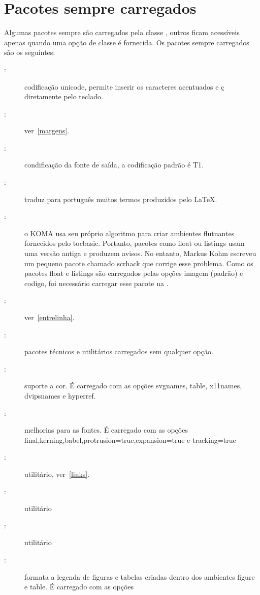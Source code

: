 \section{Pacotes sempre carregados}

Algumas pacotes sempre são carregados pela classe \estilo, outros ficam 
acessíveis apenas quando uma opção de classe é fornecida. Os pacotes 
sempre carregados são os seguintes:
\begin{description}
   \item[:] codificação unicode, permite inserir os 
   caracteres acentuados e ç diretamente pelo teclado.
   \item[:] ver~\ref{margens}.
   \item[:] condificação da fonte de saída, a codificação padrão é T1.
   \item[:] traduz para português muitos termos
        produzidos pelo \LaTeX.
   \item[:] o KOMA usa seu próprio algoritmo para criar
        ambientes flutuantes fornecidos pelo tocbasic. Portanto, pacotes
        como float ou listings usam uma versão antiga e produzem avisos.
        No entanto, Markus Kohm escreveu um pequeno pacote chamado scrhack
        que corrige esse problema. Como os pacotes float e listings são carregados
        pelas opções imagem (padrão) e codigo, foi necessário carregar esse pacote
        na \estilo.
   \item[:] ver~\ref{entrelinha}.
   \item[:] pacotes técnicos e utilitários carregados sem
   	    qualquer opção.
   \item[:] suporte a cor. É carregado com as opções
        svgnames, table, x11names, dvipsnames e hyperref.
   \item[:] melhorias para as fontes. É carregado com as opções
        final,kerning,babel,protrusion=true,expansion=true e tracking=true
   \item[:] utilitário, ver~\ref{links}.
   \item[:] utilitário
   \item[:]  utilitário
   \item[:] formata a legenda de figuras e tabelas criadas
        dentro dos ambientes figure e table. É carregado com as opções

\end{description}
